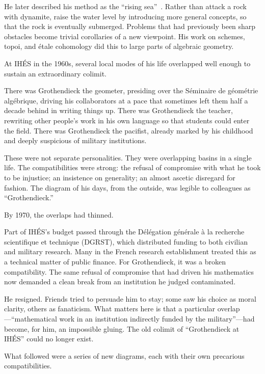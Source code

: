 He later described his method as the ``rising sea''~\cite{mclarty}. Rather than attack a rock with dynamite, raise the water level by introducing more general concepts, so that the rock is eventually submerged. Problems that had previously been sharp obstacles become trivial corollaries of a new viewpoint. His work on schemes, topoi, and \'etale cohomology did this to large parts of algebraic geometry.

At IH\'ES in the 1960s, several local modes of his life overlapped well enough to sustain an extraordinary colimit.

There was Grothendieck the geometer, presiding over the S\'eminaire de g\'eom\'etrie alg\'ebrique, driving his collaborators at a pace that sometimes left them half a decade behind in writing things up. There was Grothendieck the teacher, rewriting other people's work in his own language so that students could enter the field. There was Grothendieck the pacifist, already marked by his childhood and deeply suspicious of military institutions.

These were not separate personalities. They were overlapping basins in a single life. The compatibilities were strong: the refusal of compromise with what he took to be injustice; an insistence on generality; an almost ascetic disregard for fashion. The diagram of his days, from the outside, was legible to colleagues as ``Grothendieck.''

By 1970, the overlaps had thinned.

Part of IH\'ES's budget passed through the D\'el\'egation g\'en\'erale \`a la recherche scientifique et technique (DGRST), which distributed funding to both civilian and military research. Many in the French research establishment treated this as a technical matter of public finance. For Grothendieck, it was a broken compatibility. The same refusal of compromise that had driven his mathematics now demanded a clean break from an institution he judged contaminated.

He resigned. Friends tried to persuade him to stay; some saw his choice as moral clarity, others as fanaticism. What matters here is that a particular overlap---``mathematical work in an institution indirectly funded by the military''---had become, for him, an impossible gluing. The old colimit of ``Grothendieck at IH\'ES'' could no longer exist.

What followed were a series of new diagrams, each with their own precarious compatibilities.

